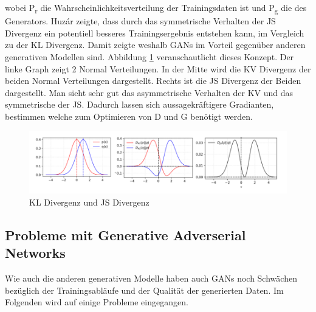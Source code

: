 \documentclass{llncs}
\begin{document}
wobei P\textsubscript{r} die Wahrscheinlichkeitsverteilung der Trainingsdaten ist und P\textsubscript{g} die des Generators. Huzár \cite{sha} zeigte, dass durch das symmetrische Verhalten der JS Divergenz ein potentiell besseres Trainingsergebnis entstehen kann, im Vergleich zu der KL Divergenz. Damit zeigte weshalb GANs im Vorteil gegenüber anderen generativen Modellen sind.  Abbildung \ref{fig:Bild7} veranschautlicht dieses Konzept.  Der linke Graph zeigt 2 Normal Verteilungen. In der Mitte wird die KV Divergenz der beiden Normal Verteilungen dargestellt.  Rechts ist die JS Divergenz der Beiden dargestellt. Man sieht sehr gut das asymmetrische Verhalten der KV und das symmetrische der JS. Dadurch lassen sich aussagekräftigere Gradianten, bestimmen welche zum Optimieren von D und G benötigt werden\cite{sha}. 
 
\begin{figure}
	\centering
	\includegraphics[width=1.0\linewidth]{KLdiv}
	\caption{KL Divergenz und JS Divergenz}
	\label{fig:Bild7}
\end{figure}

\newpage
\subsection{Probleme mit Generative Adverserial Networks}

Wie auch die anderen generativen Modelle haben auch  GANs noch Schwächen bezüglich der Trainingsabläufe und der Qualität der generierten Daten. Im Folgenden wird auf einige Probleme eingegangen.
\end{document}
